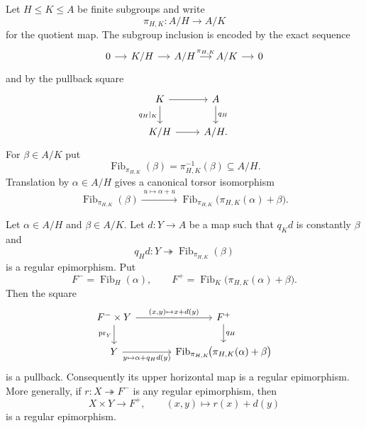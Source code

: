 Let $H\le K\le A$ be finite subgroups and write
\[
\pi_{H,K}:A/H\longrightarrow A/K
\]
for the quotient map.  The subgroup inclusion is encoded by the exact sequence
\begin{equation}\label{eq:affine-extension-exact}
\begin{tikzcd}[column sep=small]
0 \arrow[r] & K/H \arrow[r] & A/H \arrow[r,"{\pi_{H,K}}"] & A/K \arrow[r] & 0
\end{tikzcd}
\end{equation}
and by the pullback square
\begin{equation}\label{eq:affine-extension-pullback}
\begin{tikzcd}
K \arrow[r] \arrow[d,"{q_H|_K}"'] & A \arrow[d,"{q_H}"]\\
K/H \arrow[r] & A/H.
\end{tikzcd}
\end{equation}
For $\beta\in A/K$ put
\[
\operatorname{Fib}_{\pi_{H,K}}(\beta)
=\pi_{H,K}^{-1}(\beta)\subseteq A/H.
\]
Translation by $\alpha\in A/H$ gives a canonical torsor isomorphism
\begin{equation}\label{eq:fibre-translation-isomorphism}
\operatorname{Fib}_{\pi_{H,K}}(\beta)
\xrightarrow{\;u\mapsto\alpha+u\;}
\operatorname{Fib}_{\pi_{H,K}}\!\bigl(\pi_{H,K}(\alpha)+\beta\bigr).
\end{equation}

\begin{lemma}\label{lem:affine-torsor-extension}
Let $\alpha\in A/H$ and $\beta\in A/K$.  Let $d:Y\to A$ be a map such that $q_Kd$ is constantly $\beta$ and
\begin{equation}\label{eq:affine-increment-regular-epi}
q_Hd:Y\twoheadrightarrow\operatorname{Fib}_{\pi_{H,K}}(\beta)
\end{equation}
is a regular epimorphism.  Put
\[
F^- = \operatorname{Fib}_H(\alpha),
\qquad
F^+ = \operatorname{Fib}_K\!\bigl(\pi_{H,K}(\alpha)+\beta\bigr).
\]
Then the square
\begin{equation}\label{eq:affine-extension-universal-square}
\begin{tikzcd}[column sep=large]
F^-\times Y \arrow[r,"{(x,y)\mapsto x+d(y)}"] \arrow[d,"{\mathrm{pr}_Y}"']
  & F^+ \arrow[d,"{q_H}"]\\
Y \arrow[r,"{y\mapsto\alpha+q_Hd(y)}"']
  & \operatorname{Fib}_{\pi_{H,K}}\!\bigl(\pi_{H,K}(\alpha)+\beta\bigr)
\end{tikzcd}
\end{equation}
is a pullback.  Consequently its upper horizontal map is a regular epimorphism.  More generally, if $r:X\twoheadrightarrow F^-$ is any regular epimorphism, then
\[
X\times Y\longrightarrow F^+,
\qquad
(x,y)\longmapsto r(x)+d(y)
\]
is a regular epimorphism.
\end{lemma}

